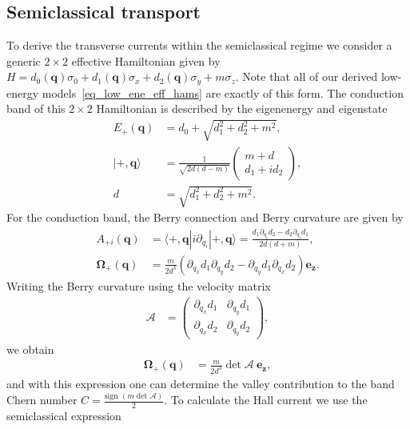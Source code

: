\documentclass[aps,preprintnumbers,amsmath,amssymb]{revtex4-2}
\begin{document}
\subsection{Semiclassical transport}\label{appendix_semiclassical_tr}
To derive the transverse currents within the semiclassical regime we consider a generic $2 \times 2$ effective Hamiltonian given by
 $H = d_0(\mathbf{q})\sigma_0 + d_1(\mathbf{q})\sigma_x + d_2(\mathbf{q})\sigma_y +m \sigma_z$.
Note that all of our
 derived low-energy models~\eqref{eq_low_ene_eff_hams} are exactly 
 of this form. 
The conduction band of this $2 \times 2$ Hamiltonian  is described by the eigenenergy and eigenstate 
\begin{align}
    E_{+}(\mathbf{q}) &= d_0 + \sqrt{d_1^2 + d_2^2 + m^2},\\
    |+,\mathbf{q}\rangle  &= \frac{1}{\sqrt{2d(d-m)}}
    \begin{pmatrix}
    m+d \\ d_1+i d_2
    \end{pmatrix},\\
    d &= \sqrt{d_1^2 + d_2^2 + m^2}.
\end{align}
For the conduction band, the Berry connection and Berry curvature are given by \cite{PhysRevB.74.085308}
\begin{align}
    A_{+i}(\mathbf{q}) &= \langle +,\mathbf{q}|i \partial_{q_i} |+,\mathbf{q}\rangle = \frac{d_1\partial_{q_i}d_2 -d_2\partial_{q_i} d_1}{2d(d+m)},\\
    \mathbf{\Omega}_{+}(\mathbf{q}) &= \frac{m}{2d^3} (\partial_{q_x} d_1 \partial_{q_y} d_2 - \partial_{q_y} d_1 \partial_{q_x} d_2) \mathbf{e_z}.
\end{align}
Writing the Berry curvature using the velocity matrix
\begin{align}
    \mathcal{A}&=\begin{pmatrix}
    \partial_{q_x} d_1 & \partial_{q_y} d_1 \\ 
    \partial_{q_x} d_2 & \partial_{q_y} d_2
    \end{pmatrix},
\end{align}
we obtain
\begin{align}
    \mathbf{\Omega}_{+}(\mathbf{q}) &= \frac{m}{2d^3} \det \mathcal{A} \ \mathbf{e_z},
\end{align}
and with this expression one can determine the valley contribution to the band Chern number $C = \tfrac{\text{sign } (m\det \mathcal{A})}{2}$. To calculate the Hall current we use the semiclassical expression~\cite{PhysRevLett.99.236809,RevModPhys.82.1959}
\end{document}
